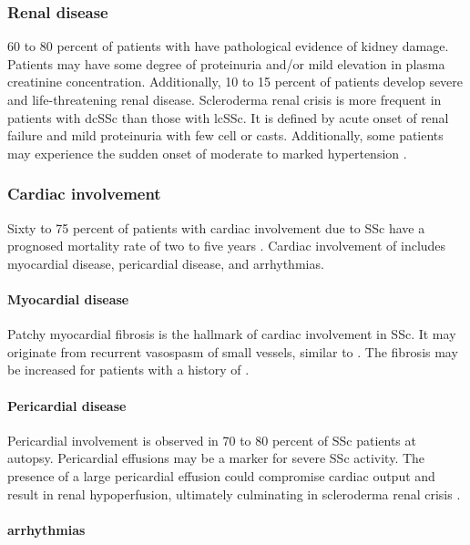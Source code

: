 \subsubsection{Renal disease}

60 to 80 percent of patients with \dcSSc have pathological evidence of kidney
damage. Patients may have some degree of proteinuria and/or mild elevation in
plasma creatinine concentration. Additionally, 10 to 15 percent of patients
develop severe and life-threatening renal disease. Scleroderma renal crisis is
more frequent in patients with dcSSc than those with lcSSc. It is defined by
acute onset of renal failure and mild proteinuria with few cell or casts.
Additionally, some patients may experience the sudden onset of moderate to
marked hypertension \citep{overviewSSc}.

\subsubsection{Cardiac involvement}

Sixty to 75 percent of patients with cardiac involvement due to SSc have a
prognosed mortality rate of two to five years \citep{overviewSSc}. Cardiac
involvement of \SSc includes myocardial disease, pericardial disease, and
arrhythmias.

\paragraph{Myocardial disease} 

Patchy myocardial fibrosis is the hallmark of cardiac involvement in SSc. It
may originate from recurrent vasospasm of small vessels, similar to \Rp. The
fibrosis may be increased for patients with a history of \Rp
\citep{overviewSSc}.

\paragraph{Pericardial disease}

Pericardial involvement is observed in 70 to 80 percent of SSc patients at
autopsy. Pericardial effusions may be a marker for severe SSc activity. The
presence of a large pericardial effusion could compromise cardiac output and
result in renal hypoperfusion, ultimately culminating in scleroderma renal
crisis \citep{overviewSSc}.

\paragraph{arrhythmias}

